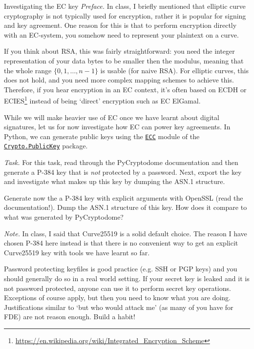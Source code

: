 \documentclass{practice}
\begin{document}
\begin{task}{Investigating the EC key}
  \textit{Preface.}
  In class, I briefly mentioned that elliptic curve cryptography is not typically used for encryption, rather it is popular for signing and key agreement.
  One reason for this is that to perform encryption directly with an EC-system, you somehow need to represent your plaintext on a curve.

  If you think about RSA, this was fairly straightforward: you need the integer representation of your data bytes to be smaller then the modulus, meaning that the whole range $\{0, 1, \dots, n - 1\}$ is usable (for naive RSA).
  For elliptic curves, this does not hold, and you need more complex mapping schemes to achieve this.
  Therefore, if you hear encryption in an EC context, it's often based on ECDH or ECIES\footnote{\url{https://en.wikipedia.org/wiki/Integrated_Encryption_Scheme}} instead of being `direct' encryption such as EC ElGamal. 

  While we will make heavier use of EC once we have learnt about digital signatures, let us for now investigate how EC can power key agreements.
  In Python, we can generate public keys using the \href{https://pycryptodome.readthedocs.io/en/latest/src/public_key/ecc.html}{\texttt{ECC}} module of the \href{https://pycryptodome.readthedocs.io/en/latest/src/public_key/public_key.html}{\texttt{Crypto.PublicKey}} package.

  \textit{Task.}
  For this task, read through the PyCryptodome documentation and then generate a P-384 key that is \emph{not} protected by a password.
  Next, export the key and investigate what makes up this key by dumping the ASN.1 structure.

  Generate now the a P-384 key with explicit arguments with OpenSSL (read the documentation!).
  Dump the ASN.1 structure of this key.
  How does it compare to what was generated by PyCryptodome?

  \textit{Note.}
  In class, I said that Curve25519 is a solid default choice.
  The reason I have chosen P-384 here instead is that there is no convenient way to get an explicit Curve25519 key with tools we have learnt so far.

  \begin{tcolorbox}[title=Warning]
    Password protecting keyfiles is good practice (e.g. SSH or PGP keys) and you should generally do so in a real world setting.
    If your secret key is leaked and it is not password protected, anyone can use it to perform secret key operations.
    \tcblower
    Exceptions of course apply, but then you need to know what you are doing.
    Justifications similar to `but who would attack me' (as many of you have for FDE) are not reason enough.
    Build a habit!
  \end{tcolorbox}
\end{task}
\end{document}
